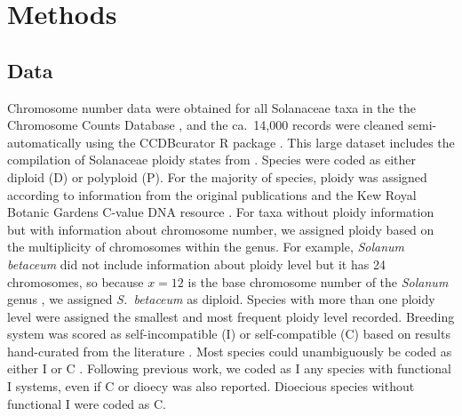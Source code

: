 \section{Methods}

\subsection{Data}

Chromosome number data were obtained for all Solanaceae taxa in the the Chromosome Counts Database \citep[CCDB;][]{rice_2015}, and the ca.~14,000 records were cleaned semi-automatically using the CCDBcurator R package \citep{rivero_2019}. 
This large dataset includes the compilation of Solanaceae ploidy states from \citet{robertson_2011}.
Species were coded as either diploid (D) or polyploid (P).
For the majority of species, ploidy was assigned according to information from the original publications and the Kew Royal Botanic Gardens C-value DNA resource \citep{bennett_2005}.
For taxa without ploidy information but with information about chromosome number, we assigned ploidy based on the multiplicity of chromosomes within the genus.
For example, \textit{Solanum betaceum} did not include information about ploidy level but it has 24 chromosomes, so because $x=12$ is the base chromosome number of the \textit{Solanum} genus \citep{olmstead_2007}, we assigned \textit{S.~betaceum} as diploid. 
Species with more than one ploidy level were assigned the smallest and most frequent ploidy level recorded.
%
Breeding system was scored as self-incompatible (I) or self-compatible (C) based on results hand-curated from the literature \citep[as compiled in][]{igic_2006, goldberg_2010, robertson_2011, goldberg_2012}.
Most species could unambiguously be coded as either I or C \citep{raduski_2012}.
Following previous work, we coded as I any species with functional I systems, even if C or dioecy was also reported.
Dioecious species without functional I were coded as C.


